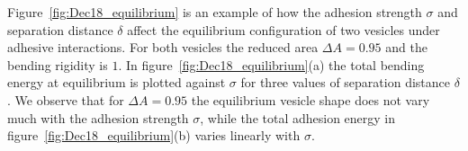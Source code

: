 \documentclass[%
preprint,
 amsmath,amssymb,
 aps,
]{revtex4-1}
\begin{document}
%
Figure~\ref{fig:Dec18_equilibrium} is an example of how the adhesion strength $\sigma$ and separation distance $\delta$ affect the equilibrium configuration of two vesicles under adhesive interactions.
For both vesicles the reduced area $\Delta A=0.95$ and the bending rigidity is $1$.
In figure~\ref{fig:Dec18_equilibrium}(a) 
the total bending energy at equilibrium is plotted against $\sigma$ for three values of separation distance $\delta$.
We observe that for $\Delta A=0.95$ the equilibrium vesicle shape does not vary much with the adhesion strength $\sigma$, while the total adhesion energy in figure~\ref{fig:Dec18_equilibrium}(b) varies linearly
with $\sigma$.



%
%
%
%
%
\end{document}
